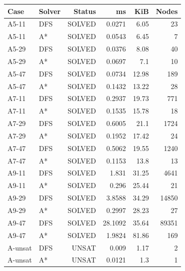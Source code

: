 \begin{center}\small
\begin{tabular}{llrrrr}
\toprule
Case & Solver & Status & ms & KiB & Nodes \\
\midrule
A5-11 & DFS & SOLVED & 0.0271 & 6.05 & 23 \\
A5-11 & A* & SOLVED & 0.0543 & 6.45 & 7 \\
A5-29 & DFS & SOLVED & 0.0376 & 8.08 & 40 \\
A5-29 & A* & SOLVED & 0.0697 & 7.1 & 10 \\
A5-47 & DFS & SOLVED & 0.0734 & 12.98 & 189 \\
A5-47 & A* & SOLVED & 0.1432 & 13.22 & 28 \\
A7-11 & DFS & SOLVED & 0.2937 & 19.73 & 771 \\
A7-11 & A* & SOLVED & 0.1535 & 15.78 & 18 \\
A7-29 & DFS & SOLVED & 0.6005 & 21.1 & 1724 \\
A7-29 & A* & SOLVED & 0.1952 & 17.42 & 24 \\
A7-47 & DFS & SOLVED & 0.5062 & 19.55 & 1240 \\
A7-47 & A* & SOLVED & 0.1153 & 13.8 & 13 \\
A9-11 & DFS & SOLVED & 1.831 & 31.25 & 4641 \\
A9-11 & A* & SOLVED & 0.296 & 25.44 & 21 \\
A9-29 & DFS & SOLVED & 3.8588 & 34.29 & 14850 \\
A9-29 & A* & SOLVED & 0.2997 & 28.23 & 27 \\
A9-47 & DFS & SOLVED & 28.1092 & 35.64 & 89351 \\
A9-47 & A* & SOLVED & 1.9824 & 81.86 & 169 \\
A-unsat & DFS & UNSAT & 0.009 & 1.17 & 2 \\
A-unsat & A* & UNSAT & 0.0121 & 1.3 & 1 \\
\bottomrule
\end{tabular}\end{center}